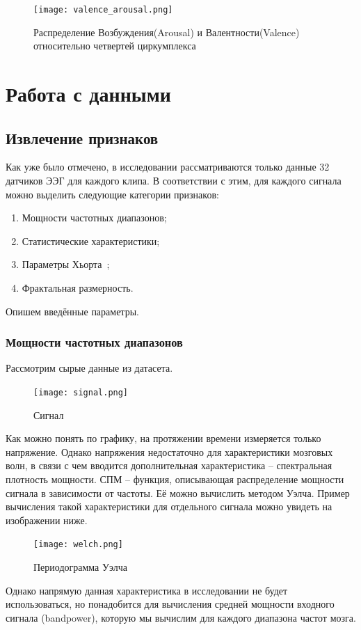 \documentclass{article}
\begin{document}
\begin{figure}[h]
\centering
\texttt{[image: valence\_arousal.png]}
\caption{Распределение Возбуждения(Arousal) и Валентности(Valence) относительно четвертей циркумплекса}
\end{figure}

\section{Работа с данными}
\subsection{Извлечение признаков}
Как уже было отмечено, в исследовании рассматриваются только данные 32 датчиков ЭЭГ для каждого клипа. В соответствии с этим, для каждого сигнала можно выделить следующие категории признаков:
\begin{enumerate}
    \item Мощности частотных диапазонов;
    \item Статистические характеристики;
    \item Параметры Хьорта~\cite{Hjorth};
    \item Фрактальная размерность.
\end{enumerate}
Опишем введённые параметры.
\subsubsection{Мощности частотных диапазонов}
Рассмотрим сырые данные из датасета.

\begin{figure}[h]
\centering
\texttt{[image: signal.png]}
\caption{Сигнал}
\end{figure}

Как можно понять по графику, на протяжении времени измеряется только напряжение. Однако напряжения недостаточно для характеристики мозговых волн, в связи с чем вводится дополнительная характеристика -- спектральная плотность мощности. СПМ -- функция, описывающая распределение мощности сигнала в зависимости от частоты. Её можно вычислить методом Уэлча\cite{Welch}.
Пример вычисления такой характеристики для отдельного сигнала можно увидеть на изображении ниже.

\begin{figure}[h]
\centering
\texttt{[image: welch.png]}
\caption{Периодограмма Уэлча}
\end{figure}

Однако напрямую данная характеристика в исследовании не будет использоваться, но понадобится для вычисления средней мощности входного сигнала (bandpower), которую мы вычислим для каждого диапазона частот мозга.
\end{document}
